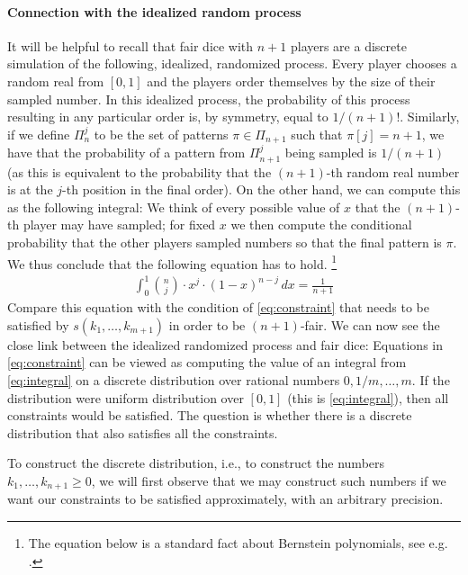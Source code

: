 \documentclass{article}
\begin{document}
\paragraph{Connection with the idealized random process}
It will be helpful to recall that fair dice with $n+1$ players are a discrete simulation of the following, idealized, randomized process. Every player chooses a random real from $[0,1]$ and the players order themselves by the size of their sampled number. In this idealized process, the probability of this process resulting in any particular order is, by symmetry, equal to $1/(n+1)!$. 
Similarly, if we define $\Pi_n^j$ to be the set of patterns $\pi \in \Pi_{n+1}$ such that $\pi[j] = n+1$, we have that the probability of a pattern from $\Pi_{n+1}^j$ being sampled is $1/(n+1)$ (as this is equivalent to the probability that the $(n+1)$-th random real number is at the $j$-th position in the final order). 
On the other hand, we can compute this as the following integral: We think of every possible value of $x$ that the $(n+1)$-th player may have sampled; for fixed $x$ we then compute the conditional probability that the other players sampled numbers so that the final pattern is $\pi$. We thus conclude that the following equation has to hold. \footnote{The equation below is a standard fact about Bernstein polynomials, see e.g. \cite{lorentz1986bernstein}. }
\begin{align}
\label{eq:integral}
\int_{0}^1 \binom{n}{j} \cdot x^j \cdot (1-x)^{n-j} \,dx = \frac{1}{n+1}
\end{align}
Compare this equation with the condition of \cref{eq:constraint} that needs to be satisfied by $s(k_1, \dots, k_{m+1})$ in order to be $(n+1)$-fair. 
We can now see the close link between the idealized randomized process and fair dice: Equations in \cref{eq:constraint} can be viewed as computing the value of an integral from \cref{eq:integral} on a discrete distribution over rational numbers $0, 1/m, \dots, m$. If the distribution were uniform distribution over $[0,1]$ (this is \cref{eq:integral}), then all constraints would be satisfied. The question is whether there is a discrete distribution that also satisfies all the constraints.  

To construct the discrete distribution, i.e., to construct the numbers $k_1, \dots, k_{n+1} \ge 0$, we will first observe that we may construct such numbers if we want our constraints to be satisfied approximately, with an arbitrary precision. 
\end{document}
